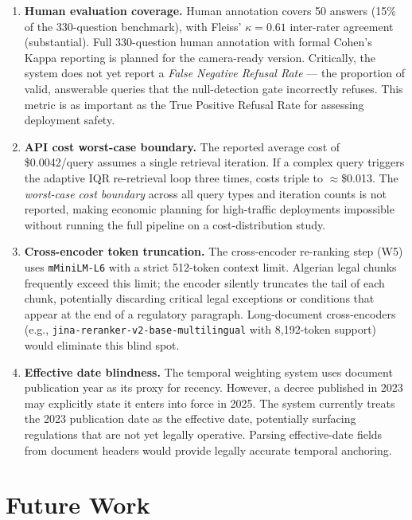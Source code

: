 \documentclass[12pt,a4paper]{article}
\begin{document}
\begin{enumerate}[leftmargin=*]
\item \textbf{Human evaluation coverage.}
Human annotation covers 50 answers (15\% of the 330-question benchmark), with
Fleiss' $\kappa = 0.61$ inter-rater agreement (substantial). Full 330-question
human annotation with formal Cohen's Kappa reporting is planned for the
camera-ready version. Critically, the system does not yet report a
\emph{False Negative Refusal Rate} — the proportion of valid, answerable
queries that the null-detection gate incorrectly refuses. This metric is as
important as the True Positive Refusal Rate for assessing deployment safety.

\item \textbf{API cost worst-case boundary.}
The reported average cost of \$0.0042/query assumes a single retrieval iteration.
If a complex query triggers the adaptive IQR re-retrieval loop three times, costs
triple to $\approx$\$0.013. The \emph{worst-case cost boundary} across all query
types and iteration counts is not reported, making economic planning for
high-traffic deployments impossible without running the full pipeline on a
cost-distribution study.

\item \textbf{Cross-encoder token truncation.}
The cross-encoder re-ranking step (W5) uses \texttt{mMiniLM-L6} with a strict
512-token context limit. Algerian legal chunks frequently exceed this limit;
the encoder silently truncates the tail of each chunk, potentially discarding
critical legal exceptions or conditions that appear at the end of a regulatory
paragraph. Long-document cross-encoders (e.g., \texttt{jina-reranker-v2-base-multilingual}
with 8,192-token support) would eliminate this blind spot.

\item \textbf{Effective date blindness.}
The temporal weighting system uses document publication year as its proxy for
recency. However, a decree published in 2023 may explicitly state it enters
into force in 2025. The system currently treats the 2023 publication date as
the effective date, potentially surfacing regulations that are not yet legally
operative. Parsing effective-date fields from document headers would provide
legally accurate temporal anchoring.

\end{enumerate}

\section{Future Work}
\label{sec:future}
\end{document}
